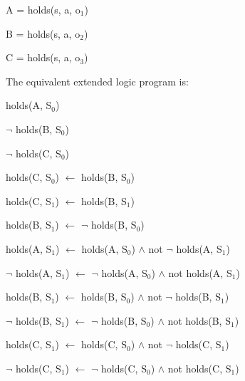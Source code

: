 \documentclass[a4paper]{article}
\begin{document}
        \begin{list}{}{}
          \item A = holds(s, a, o$_{1}$)
          \item B = holds(s, a, o$_{2}$)
          \item C = holds(s, a, o$_{3}$)
        \end{list}

        The equivalent extended logic program is:

        \begin{list}{}{Initial State}
          \item holds(A, S$_{0}$)
          \item $\lnot$ holds(B, S$_{0}$)
          \item $\lnot$ holds(C, S$_{0}$)
        \end{list}

        \begin{list}{}{Constraint}
          \item holds(C, S$_{0}$) $\leftarrow$ holds(B, S$_{0}$)
          \item holds(C, S$_{1}$) $\leftarrow$ holds(B, S$_{1}$)
        \end{list}

        \begin{list}{}{Transformation}
          \item holds(B, S$_{1}$) $\leftarrow$ $\lnot$ holds(B, S$_{0}$)
        \end{list}

        \begin{list}{}{Inertial Rules}
          \item
            holds(A, S$_{1}$) $\leftarrow$ holds(A, S$_{0}$) $\land$ not
            $\lnot$ holds(A, S$_{1}$)
          \item
            $\lnot$ holds(A, S$_{1}$) $\leftarrow$ $\lnot$ holds(A, S$_{0}$) 
            $\land$ not holds(A, S$_{1}$)
          \item
            holds(B, S$_{1}$) $\leftarrow$ holds(B, S$_{0}$) $\land$ not
            $\lnot$ holds(B, S$_{1}$)
          \item
            $\lnot$ holds(B, S$_{1}$) $\leftarrow$ $\lnot$ holds(B, S$_{0}$) 
            $\land$ not holds(B, S$_{1}$)
          \item
            holds(C, S$_{1}$) $\leftarrow$ holds(C, S$_{0}$) $\land$ not
            $\lnot$ holds(C, S$_{1}$)
          \item
            $\lnot$ holds(C, S$_{1}$) $\leftarrow$ $\lnot$ holds(C, S$_{0}$)
            $\land$ not holds(C, S$_{1}$)
        \end{list}
\end{document}
